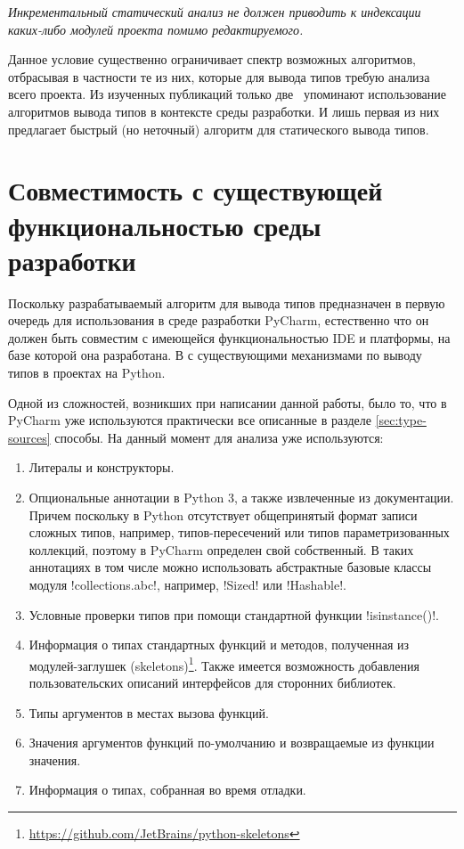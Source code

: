 \emph{Инкрементальный статический анализ не должен приводить к индексации 
 каких-либо модулей проекта помимо редактируемого.}

Данное условие существенно ограничивает спектр возможных алгоритмов, отбрасывая
в частности те из них, которые для вывода типов требую анализа всего проекта. Из
 изученных публикаций только две~\cite{Pluquet2009,Haupt2011} упоминают
использование алгоритмов вывода типов в контексте среды разработки. И лишь
первая из них предлагает быстрый (но неточный) алгоритм для статического вывода типов.

\section{Совместимость с существующей функциональностью среды разработки}
\label{sec:compatibility-requirement}

Поскольку разрабатываемый алгоритм для вывода типов предназначен в первую
очередь для использования в среде разработки PyCharm, естественно что он должен
быть совместим с имеющейся функциональностью IDE и платформы, на базе которой
она разработана. В с существующими механизмами по выводу типов в проектах на
Python. 

Одной из сложностей, возникших при написании данной работы, было то, что в
PyCharm уже используются практически все описанные в разделе
\ref{sec:type-sources} способы. На данный момент для анализа уже используются:

\begin{enumerate}
    \item{%
        Литералы и конструкторы.
      }
    \item{%
        Опциональные аннотации в Python 3, а также извлеченные из
        документации. Причем поскольку в Python отсутствует общепринятый формат
        записи сложных типов, например, типов-пересечений или типов
        параметризованных коллекций, поэтому в PyCharm определен свой собственный.
        В таких аннотациях в том числе можно использовать абстрактные базовые
        классы модуля !collections.abc!, например, !Sized! или !Hashable!.
    }
    \item{%
        Условные проверки типов при помощи стандартной функции !isinstance()!.
      }
    \item{%
        Информация о типах стандартных функций и методов, полученная из
        модулей-заглушек
        (skeletons)\footnote{\url{https://github.com/JetBrains/python-skeletons}}.
        Также имеется возможность добавления пользовательских описаний
        интерфейсов для сторонних библиотек.
      }
    \item{%
        Типы аргументов в местах вызова функций.
      }
    \item{%
        Значения аргументов функций по-умолчанию и возвращаемые из функции
        значения.
      }
    \item{%
        Информация о типах, собранная во время отладки.
      }
\end{enumerate}

